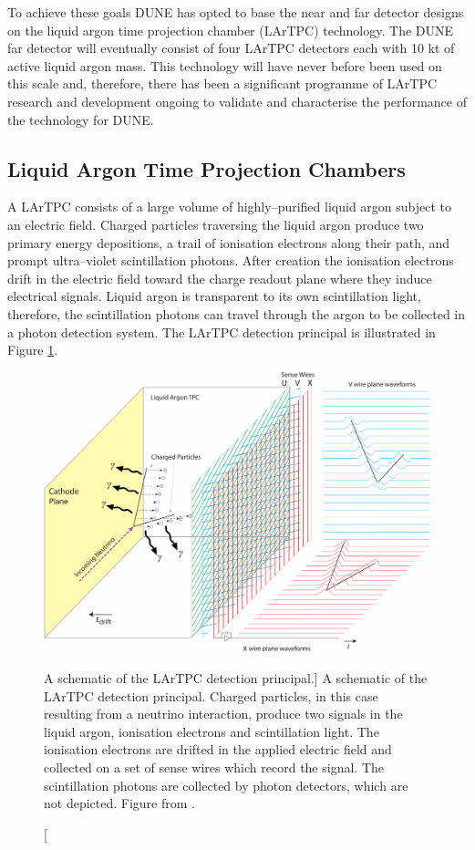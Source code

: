 To achieve these goals DUNE has opted to base the near and far detector designs
on the liquid argon time projection chamber (LArTPC) technology. The DUNE
far detector will eventually consist of four LArTPC detectors each with 10 kt 
of active liquid argon mass. This technology will have never before been used 
on this scale and, therefore, there has been a significant programme of LArTPC 
research and development ongoing to validate and characterise the performance 
of the technology for DUNE. 

\subsection{Liquid Argon Time Projection Chambers}
A LArTPC consists of a large volume of highly--purified liquid argon subject to
an electric field. Charged particles traversing the liquid argon produce two
primary energy depositions, a trail of ionisation electrons along their path,
and prompt ultra--violet scintillation photons. After creation the ionisation
electrons drift in the electric field toward the charge readout plane where they
induce electrical signals. Liquid argon is transparent to its own scintillation
light, therefore, the scintillation photons can travel through the argon to be
collected in a photon detection system. The LArTPC detection principal is 
illustrated in Figure \ref{fig:lartpc}. 

\begin{figure}

	\centering

	\includegraphics[width=\textwidth]{figures/LArTPC_Concept.pdf}

	\caption
	[A schematic of the LArTPC detection principal.]
	{A schematic of the LArTPC detection principal. Charged particles, in this
	case resulting from a neutrino interaction, produce two signals in the liquid
	argon, ionisation electrons and scintillation light. The ionisation electrons
	are drifted in the applied electric field and collected on a set of sense
	wires which record the signal. The scintillation photons are collected by 
	photon detectors, which are not depicted. Figure from \cite{Abi:2020loh}.}

	\label{fig:lartpc}

\end{figure}

